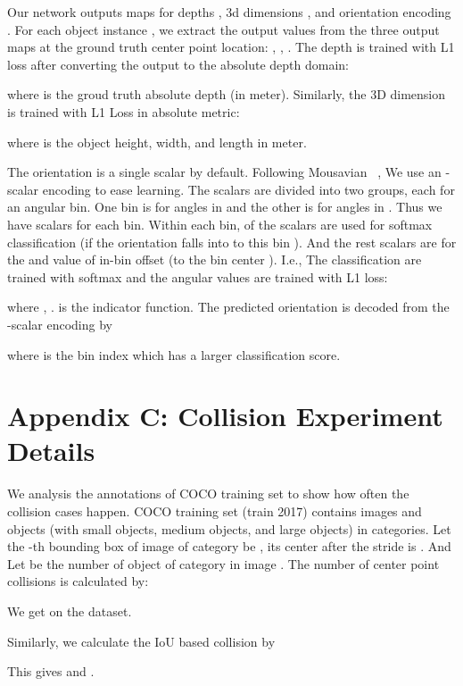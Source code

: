 \documentclass[10pt,twocolumn,letterpaper]{article}
\begin{document}
Our network outputs maps for depths , 3d dimensions , and orientation encoding . 
For each object instance , we extract the output values from the three output maps at the ground truth center point location:
, , .
The depth is trained with L1 loss after converting the output to the absolute depth domain:

where  is the groud truth absolute depth (in meter).
Similarly, the 3D dimension is trained with L1 Loss in absolute metric:

where  is the object height, width, and length in meter.

The orientation  is a single scalar by default.
Following Mousavian \etal~\cite{mousavian20173d,hu2018joint}, We use an -scalar encoding to ease learning.
The  scalars are divided into two groups, each for an angular bin.
One bin is for angles in  and the other is for angles in . 
Thus we have  scalars for each bin.
Within each bin,  of the scalars  are used for softmax classification (if the orientation falls into to this bin ).
And the rest  scalars  are for the  and  value of in-bin offset (to the bin center ).
I.e., 
The classification are trained with softmax and the angular values are trained with L1 loss:

where , .
 is the indicator function.
The predicted orientation  is decoded from the -scalar encoding by

where  is the bin index which has a larger classification score.

\section*{Appendix C: Collision Experiment Details}
We analysis the annotations of COCO training set to show how often the collision cases happen.
COCO training set (train 2017) contains  images and  objects (with  small objects,  medium objects, and  large objects) in  categories.
Let the -th bounding box of image  of category  be  , 
its center after the  stride is .
And Let  be the number of object of category  in image .
The number of center point collisions is calculated by:

We get  on the dataset.

Similarly, we calculate the IoU based collision by

This gives  and .
\end{document}
